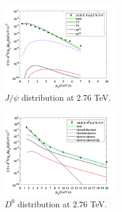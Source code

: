 \documentclass[twocolumn,aps,superscriptaddress,nofootinbib,floatfix]{revtex4}
\begin{document}
 \begin{figure}[H]
	\includegraphics[width=0.45\textwidth]{v16_Jpsi_276.png}
	\caption{$J/\psi$ distribution at 2.76 TeV. }
	\label{fig81}
\end{figure}
\begin{figure}[H]
	\includegraphics[width=0.45\textwidth]{v16_D0_276.png}
	\caption{$D^0$ distribution at 2.76 TeV. }
	\label{fig82}
\end{figure}
\end{document}
